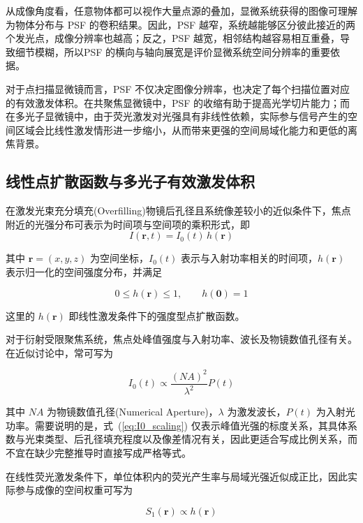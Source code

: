 从成像角度看，任意物体都可以视作大量点源的叠加，显微系统获得的图像可理解为物体分布与 PSF 的卷积结果。因此，PSF 越窄，系统越能够区分彼此接近的两个发光点，成像分辨率也越高；反之，PSF 越宽，相邻结构越容易相互重叠，导致细节模糊，所以PSF 的横向与轴向展宽是评价显微系统空间分辨率的重要依据。

对于点扫描显微镜而言，PSF 不仅决定图像分辨率，也决定了每个扫描位置对应的有效激发体积。在共聚焦显微镜中，PSF 的收缩有助于提高光学切片能力；而在多光子显微镜中，由于荧光激发对光强具有非线性依赖，实际参与信号产生的空间区域会比线性激发情形进一步缩小，从而带来更强的空间局域化能力和更低的离焦背景。




\subsection{线性点扩散函数与多光子有效激发体积}\label{2.2.1}
在激发光束充分填充(Overfilling)物镜后孔径且系统像差较小的近似条件下，焦点附近的光强分布可表示为时间项与空间项的乘积形式，即
\begin{equation}
  I(\mathbf{r},t)=I_{0}(t)\,h(\mathbf{r})
  \label{eq:psf_separation}
\end{equation}

其中 $\mathbf{r}=(x,y,z)$ 为空间坐标，$I_{0}(t)$ 表示与入射功率相关的时间项，$h(\mathbf{r})$ 表示归一化的空间强度分布，并满足

\begin{equation}
  0\le h(\mathbf{r})\le 1,\qquad h(\mathbf{0})=1
\end{equation}

这里的 $h(\mathbf{r})$ 即线性激发条件下的强度型点扩散函数。

对于衍射受限聚焦系统，焦点处峰值强度与入射功率、波长及物镜数值孔径有关。在近似讨论中，常可写为

\begin{equation}
  I_{0}(t)\propto \frac{(NA)^2}{\lambda^2}P(t)
  \label{eq:I0_scaling}
\end{equation}

其中 $NA$ 为物镜数值孔径(Numerical Aperture)，$\lambda$ 为激发波长，$P(t)$ 为入射光功率。需要说明的是，式~(\ref{eq:I0_scaling}) 仅表示峰值光强的标度关系，其具体系数与光束类型、后孔径填充程度以及像差情况有关，因此更适合写成比例关系，而不宜在缺少完整推导时直接写成严格等式。

在线性荧光激发条件下，单位体积内的荧光产生率与局域光强近似成正比，因此实际参与成像的空间权重可写为

\begin{equation}
  S_{1}(\mathbf{r})\propto h(\mathbf{r})
  \label{eq:linear_psf}
\end{equation}

